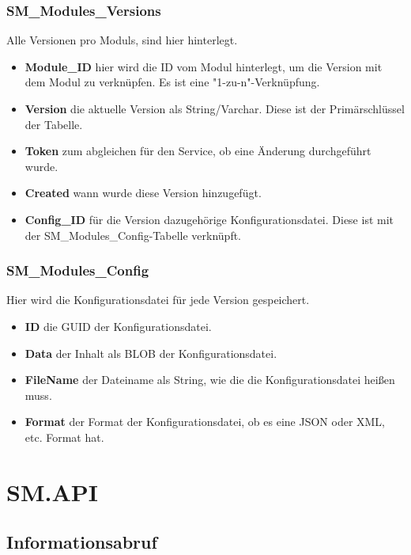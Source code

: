 \documentclass{article}
\begin{document}
\subsubsection{SM\_Modules\_Versions}

Alle Versionen pro Moduls, sind hier hinterlegt.

\begin{itemize}
  \item \textbf{Module\_ID} hier wird die ID vom Modul hinterlegt, um die Version mit dem Modul zu verknüpfen. Es ist eine "1-zu-n"-Verknüpfung.
  \item \textbf{Version} die aktuelle Version als String/Varchar. Diese ist der Primärschlüssel der Tabelle.
  \item \textbf{Token} zum abgleichen für den Service, ob eine Änderung durchgeführt wurde.
  \item \textbf{Created} wann wurde diese Version hinzugefügt.
  \item \textbf{Config\_ID} für die Version dazugehörige Konfigurationsdatei. Diese ist mit der SM\_Modules\_Config-Tabelle verknüpft. 
\end{itemize}

\subsubsection{SM\_Modules\_Config}

Hier wird die Konfigurationsdatei für jede Version gespeichert.

\begin{itemize}
  \item \textbf{ID} die GUID der Konfigurationsdatei.
  \item \textbf{Data} der Inhalt als BLOB der Konfigurationsdatei.
  \item \textbf{FileName} der Dateiname als String, wie die die Konfigurationsdatei heißen muss.
  \item \textbf{Format} der Format der Konfigurationsdatei, ob es eine JSON oder XML, etc. Format hat.
\end{itemize}


\section{SM.API}
\label{sec:sm.api}

\subsection{Informationsabruf}
\end{document}
